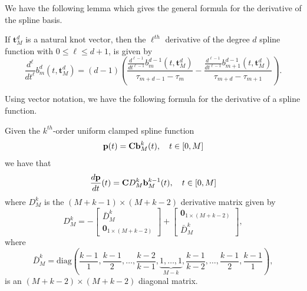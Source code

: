 We have the following lemma which gives the general formula for the derivative of the spline basis.
\begin{lemma}\label{lem:derivative_basis_functions}
If $\mathbf{t}_M^d$ is a natural knot vector, then the $\ell^{th}$ derivative of the degree $d$ spline function with  $0\leq \ell \leq d+1$, is given by
\[
\frac{d^\ell}{dt^\ell}b_m^{d}(t,  \mathbf{t}_M^d) = (d-1)\left(\frac{\frac{d^{\ell-1}}{dt^{\ell-1}}b_m^{d-1}(t,  \mathbf{t}_M^d)}{\tau_{m+d-1}-\tau_m} - \frac{\frac{d^{\ell-1}}{dt^{\ell-1}}b_{m+1}^{d-1}(t,  \mathbf{t}_M^d)}{\tau_{m+d}-\tau_{m+1}} \right).
\]	
\end{lemma}

Using vector notation, we have the following formula for the derivative of a spline function.
\begin{lemma} \label{lem:derivative_of_spline}
Given the $k^{th}$-order uniform clamped spline function
\[
\mathbf{p}(t) = \mathbf{C} \mathbf{b}_M^k(t), \quad t\in[0, M]
\]
we have that
\[
\frac{d\mathbf{p}}{dt}(t) = \mathbf{C} D_M^k \mathbf{b}_M^{k-1}(t), \quad t\in[0, M]
\]	
where $D_M^k$ is the $(M+k-1)\times (M+k-2)$ derivative matrix given by
\begin{equation}\label{eq:D_k}
D_M^k = -\begin{bmatrix}\bar{D}_M^k \\ \mathbf{0}_{1\times(M+k-2)} \end{bmatrix} + \begin{bmatrix}\mathbf{0}_{1\times(M+k-2)} \\ \bar{D}_M^k \end{bmatrix},
\end{equation}
where
\begin{equation}\label{eq:D_k_bar}
\bar{D}_M^k = \text{diag}\left(\frac{k-1}{1}, \frac{k-1}{2}, \dots, \frac{k-2}{k-1}, \underbrace{1, \dots, 1}_{M-k}, \frac{k-1}{k-2}, \dots, \frac{k-1}{2}, \frac{k-1}{1}\right),
\end{equation}
is an $(M+k-2)\times(M+k-2)$ diagonal matrix.
\end{lemma}
